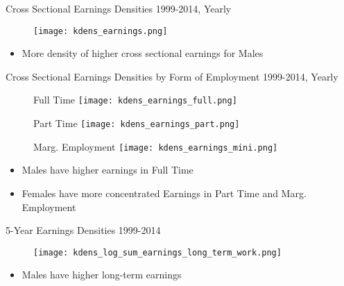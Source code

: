 \documentclass[hyperref={bookmarks=false}]{beamer}
\begin{document}
\begin{appendix}
\begin{frame}{Cross Sectional Earnings Densities}
1999-2014, Yearly
\begin{figure}[!t]
\centering
\begin{minipage}[b]{0.32\textwidth}{}
\centering
\texttt{[image: kdens\_earnings.png]}
\end{minipage}
\end{figure}
\begin{itemize}
\setlength{\itemsep}{0.7 cm}
\item More density of higher cross sectional earnings for Males
\end{itemize}
\end{frame}

\begin{frame}{Cross Sectional Earnings Densities by Form of Employment}
1999-2014, Yearly
\begin{figure}[!t]
\centering
\begin{minipage}[b]{0.32\textwidth}{Full Time}
\centering
\texttt{[image: kdens\_earnings\_full.png]}
\end{minipage}
\begin{minipage}[b]{0.32\textwidth}{Part Time}
\centering
\texttt{[image: kdens\_earnings\_part.png]}
\end{minipage}
\begin{minipage}[b]{0.32\textwidth}{Marg. Employment}
\centering
\texttt{[image: kdens\_earnings\_mini.png]}
\end{minipage}
\end{figure}
\begin{itemize}
\setlength{\itemsep}{0.7 cm}
\item Males have higher earnings in Full Time
\item Females have more concentrated Earnings in Part Time and Marg. Employment
\end{itemize}
\end{frame}


\begin{frame}{5-Year Earnings Densities}
1999-2014
\begin{figure}[!t]
\centering
\begin{minipage}[b]{0.32\textwidth}{}
\centering
\texttt{[image: kdens\_log\_sum\_earnings\_long\_term\_work.png]}
\end{minipage}
\end{figure}
\begin{itemize}
\setlength{\itemsep}{0.7 cm}
\item Males have higher long-term earnings
\end{itemize}
\end{frame}


\end{appendix}
\end{document}
